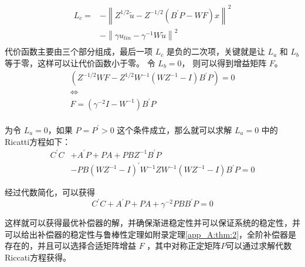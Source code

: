 \begin{equation}
\begin{aligned}
\label{eq:chap6:Lc}
L_c =& - \left \|Z^{1/2}\tilde{u} - Z^{-1/2}(B^{'}P-WF)x\right \|^{2}  \\
& - \left \|\gamma u_{lin}-\gamma^{-1} W \tilde{u}\right \|^{2}
\\
\end{aligned}
\end{equation}
代价函数主要由三个部分组成，最后一项 $L_c$ 是负的二次项，关键就是让 $L_a$ 和 $L_b$ 等于零，这样可以让代价函数小于零。 令 $L_b = 0$， 则可以得到增益矩阵 $F$。
\begin{equation}
\label{eq:chap6:F}
\begin{aligned}
(Z^{-1/2}WF - Z^{1/2}W^{-1}(WZ^{-1}-I)B^{'}P)=0 \\
\Leftrightarrow\\
  F = (\gamma ^{-2}I - W^{-1}) B^{'}P\\
\end{aligned}
\end{equation}

为令 $L_a = 0$，如果 $P = P^{'}>0$ 这个条件成立，那么就可以求解 $L_a = 0$ 中的Ricatti方程如下：
\begin{equation}
\label{eq:chap6:ricatti}
\begin{aligned}
C^{'}C &+ A^{'}P + PA + PBZ^{-1} B^{'} P \\
&- PB(WZ^{-1} - I)^{'} W^{-1} Z W^{-1} (W Z^{-1} - I)B^{'}P = 0
\end{aligned}
\end{equation}

经过代数简化，可以获得
\begin{equation}
\label{eq:chap6:ricatti_simple}
C^{'}C + A^{'}P + PA + \gamma ^{-2}PBB^{'}P = 0
\end{equation}

这样就可以获得最优补偿器的解，并确保渐进稳定性并可以保证系统的稳定性，并可以给出补偿器的稳定性与鲁棒性定理如附录定理\ref{app_A:thm:2}，全阶补偿器是存在的，并且可以选择合适矩阵增益 $F$ ，其中对称正定矩阵$P$可以通过求解代数Riccati方程获得。



